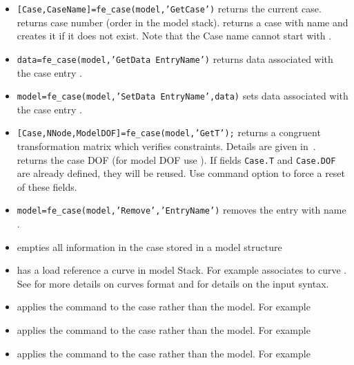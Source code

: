 \begin{itemize}

\item {\tt [Case,CaseName]=fe\_case(model,'GetCase')} returns the current case. \\
 returns case number  (order in the model stack).  returns a case with name  and creates it if it does not exist. Note that the Case name cannot start with .

\item {\tt data=fe\_case(model,'GetData {\ti EntryName}')} returns data associated with the case entry {\ti {}}.

\item {\tt model=fe\_case(model,'SetData {\ti EntryName}',data)} sets data associated with the case entry {\ti {}}.

\item {\tt [Case,NNode,ModelDOF]=fe\_case(model,'GetT');} returns a congruent transformation matrix which verifies constraints. Details are given in~.  returns the case DOF (for model DOF use ). If fields {\tt Case.T} and {\tt Case.DOF} are already defined, they will be reused. Use command option  to force a reset of these fields.

\item {\tt model=fe\_case(model,'Remove','{\ti EntryName}')} removes the entry with name .

\item {} empties all information in the case stored in a model structure 

\item {} has a load reference a curve in model Stack. For example  associates  to curve . See  for more details on curves format and  for details on the input syntax.

\item {} applies the command to the case rather than the model. For example 
\item {} applies the command to the case rather than the model. For example 
\item {} applies the command to the case rather than the model. For example 

\end{itemize}

